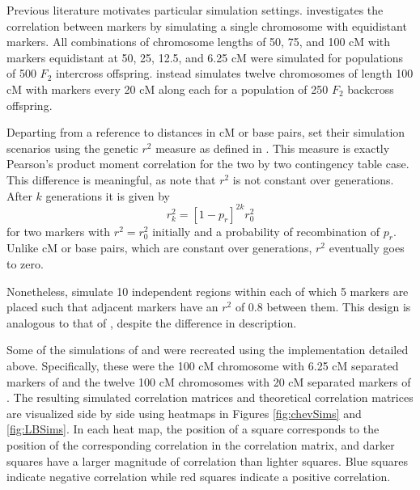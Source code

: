 \documentclass{article}
\begin{document}
Previous literature motivates particular simulation settings. \cite{cheverud2001} investigates the correlation between markers by simulating a single chromosome with equidistant markers. All combinations of chromosome lengths of 50, 75, and 100 cM with markers equidistant at 50, 25, 12.5, and 6.25 cM were simulated for populations of 500 $F_2$ intercross offspring. \cite{LanderBotstein1989} instead simulates twelve chromosomes of length 100 cM with markers every 20 cM along each for a population of 250 $F_2$ backcross offspring.

Departing from a reference to distances in cM or base pairs, \cite{LiJi2005} set their simulation scenarios using the genetic $r^2$ measure as defined in \cite{hillrobertson1968}. This measure is exactly Pearson's product moment correlation for the two by two contingency table case.
This difference is meaningful, as \cite{siegmundyakir2007} note that $r^2$ is not constant over generations. After $k$ generations it is given by
$$r_k^2 = \left [ 1 - p_r \right ]^{2k}  r^2_0$$
for two markers with $r^2 = r^2_0$ initially and a probability of recombination of $p_r$. Unlike cM or base pairs, which are constant over generations, $r^2$ eventually goes to zero.

Nonetheless, \cite{LiJi2005} simulate 10 independent regions within each of which 5 markers are placed such that adjacent markers have an $r^2$ of 0.8 between them. This design is analogous to that of \cite{LanderBotstein1989}, despite the difference in description.

Some of the simulations of \cite{cheverud2001} and \cite{LanderBotstein1989} were recreated using the implementation detailed above. Specifically, these were the 100 cM chromosome with 6.25 cM separated markers of \cite{cheverud2001} and the twelve 100 cM chromosomes with 20 cM separated markers of \cite{LanderBotstein1989}. The resulting simulated correlation matrices and theoretical correlation matrices are visualized side by side using heatmaps in Figures \ref{fig:chevSims} and \ref{fig:LBSims}. In each heat map, the position of a square corresponds to the position of the corresponding correlation in the correlation matrix, and darker squares have a larger magnitude of correlation than lighter squares. Blue squares indicate negative correlation while red squares indicate a positive correlation.
\end{document}
